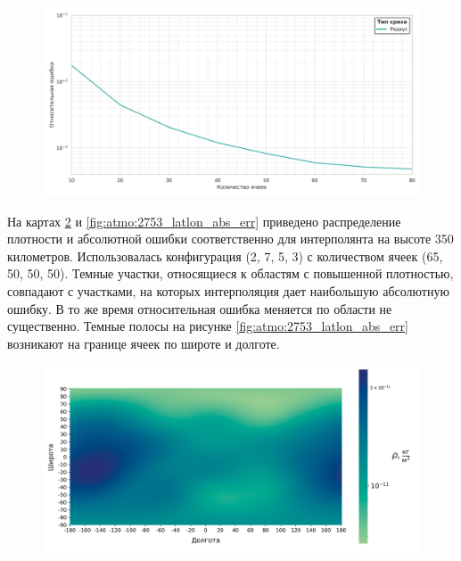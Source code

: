  \begin{figure}[h!]
    \centering
    \includegraphics[width=\linewidth]{../images/solution/atmo/2357_rho.png}
    \label{fig:atmo:2357_rho}
 \end{figure}

 На картах \ref{fig:atmo:2753_latlon} и \ref{fig:atmo:2753_latlon_abs_err} приведено
 распределение плотности и абсолютной ошибки соответственно для интерполянта на высоте 350 километров.
 Использовалась конфигурация (2, 7, 5, 3) с количеством ячеек (65, 50, 50, 50). Темные участки, относящиеся к областям с
 повышенной плотностью, совпадают с участками, на которых интерполяция дает наибольшую абсолютную ошибку.
 В то же время относительная ошибка меняется по области не существенно.
 Темные полосы на рисунке \ref{fig:atmo:2753_latlon_abs_err} возникают на границе ячеек
 по широте и долготе.

 \begin{figure}[h!]
    \centering
    \includegraphics[width=\linewidth]{../images/solution/atmo/2753_latlon_direct_val_heatmap.png}
    \label{fig:atmo:2753_latlon}
 \end{figure}

